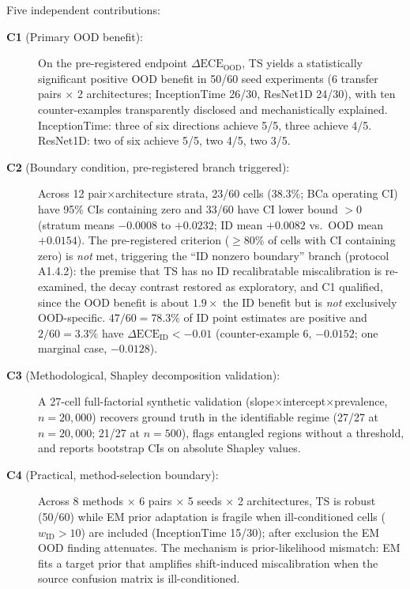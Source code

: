 \documentclass[review,12pt,nonatbib]{elsarticle}
\begin{document}
Five independent contributions:
\begin{description}
    \item[\textbf{C1} (Primary OOD benefit):] On the pre-registered
    endpoint $\Delta\text{ECE}_{\text{OOD}}$, TS yields a statistically
    significant positive OOD benefit in 50/60 seed experiments (6 transfer
    pairs $\times$ 2 architectures; InceptionTime 26/30, ResNet1D 24/30),
    with ten counter-examples transparently disclosed and mechanistically
    explained.
    InceptionTime: three of six directions achieve 5/5, three achieve 4/5.
    ResNet1D: two of six achieve 5/5, two 4/5, two 3/5.
    \item[\textbf{C2} (Boundary condition, pre-registered branch triggered):]
    Across 12 pair$\times$architecture strata, 23/60 cells (38.3\%;
    BCa operating CI) have 95\% CIs containing zero and 33/60 have CI
    lower bound $>0$ (stratum means $-0.0008$ to $+0.0232$; ID mean
    $+0.0082$ vs.\ OOD mean $+0.0154$). The pre-registered criterion
    ($\geq$80\% of cells with CI containing zero) is \emph{not} met,
    triggering the ``ID nonzero boundary'' branch (protocol A1.4.2):
    the premise that TS has no ID recalibratable miscalibration is
    re-examined, the decay contrast restored as exploratory, and C1
    qualified, since the OOD benefit is about $1.9\times$ the ID benefit
    but is \emph{not} exclusively OOD-specific. $47/60 = 78.3\%$ of ID
    point estimates are positive and $2/60 = 3.3\%$ have
    $\Delta\text{ECE}_{\text{ID}} < -0.01$ (counter-example 6, $-0.0152$;
    one marginal case, $-0.0128$).
    \item[\textbf{C3} (Methodological, Shapley decomposition validation):]
    A 27-cell full-factorial synthetic validation
    (slope$\times$intercept$\times$prevalence, $n=20{,}000$) recovers
    ground truth in the identifiable regime (27/27 at $n=20{,}000$;
    21/27 at $n=500$), flags entangled regions without a threshold,
    and reports bootstrap CIs on absolute Shapley values.
    \item[\textbf{C4} (Practical, method-selection boundary):] Across
    8 methods $\times$ 6 pairs $\times$ 5 seeds $\times$ 2 architectures,
    TS is robust (50/60) while EM prior adaptation is fragile when
    ill-conditioned cells ($w_{\text{ID}}>10$) are included (InceptionTime
    15/30); after exclusion the EM OOD finding attenuates. The mechanism
    is prior-likelihood mismatch: EM fits a target prior that amplifies
    shift-induced miscalibration when the source confusion matrix is
    ill-conditioned.

\end{description}
\end{document}
